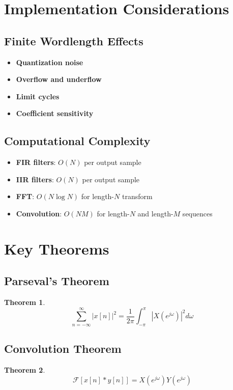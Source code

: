 \documentclass[11pt]{article}
\theoremstyle{definition}
\newtheorem{theorem}{Theorem}[section]
\begin{document}
\section{Implementation Considerations}

\subsection{Finite Wordlength Effects}
\begin{itemize}
    \item \textbf{Quantization noise}
    \item \textbf{Overflow and underflow}
    \item \textbf{Limit cycles}
    \item \textbf{Coefficient sensitivity}
\end{itemize}

\subsection{Computational Complexity}
\begin{itemize}
    \item \textbf{FIR filters}: $O(N)$ per output sample
    \item \textbf{IIR filters}: $O(N)$ per output sample
    \item \textbf{FFT}: $O(N \log N)$ for length-$N$ transform
    \item \textbf{Convolution}: $O(NM)$ for length-$N$ and length-$M$ sequences
\end{itemize}

\section{Key Theorems}

\subsection{Parseval's Theorem}
\begin{theorem}
$$\sum_{n=-\infty}^{\infty} |x[n]|^2 = \frac{1}{2\pi} \int_{-\pi}^{\pi} |X(e^{j\omega})|^2 d\omega$$
\end{theorem}

\subsection{Convolution Theorem}
\begin{theorem}
$$\mathcal{F}[x[n] * y[n]] = X(e^{j\omega}) Y(e^{j\omega})$$
\end{theorem}
\end{document}
